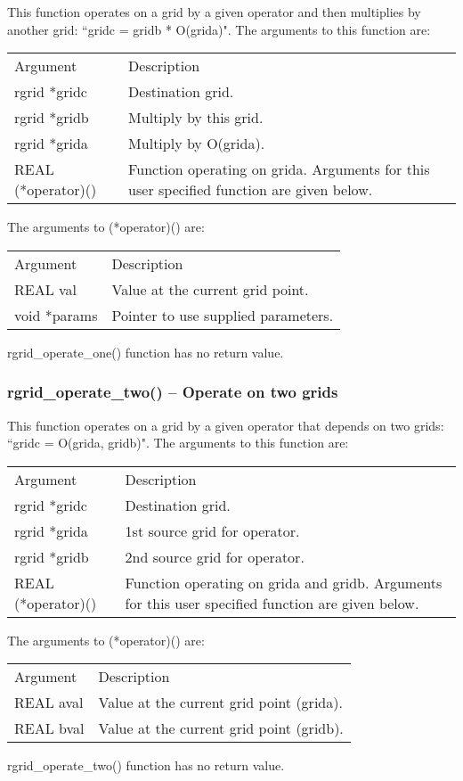\documentclass[12pt,letterpaper]{article}
\begin{document}
This function  operates on a grid by a given operator and then multiplies by another grid: ``gridc = gridb * O(grida)". The arguments to this function are:
\begin{longtable}{p{} p{}}
Argument & Description\\
\cline{1-2}
rgrid *gridc & Destination grid.\\
rgrid *gridb & Multiply by this grid.\\
rgrid *grida & Multiply by O(grida).\\
REAL (*operator)() & Function operating on grida. Arguments for this user specified function are given below.\\
\end{longtable}
The arguments to (*operator)() are:
\begin{longtable}{p{} p{}}
Argument & Description\\
\cline{1-2}
REAL val & Value at the current grid point.\\
void *params & Pointer to use supplied parameters.\\
\end{longtable}
\noindent
rgrid\_operate\_one() function has no return value.

\subsubsection{rgrid\_operate\_two() -- Operate on two grids}

This function  operates on a grid by a given operator that depends on two grids: ``gridc = O(grida, gridb)". The arguments to this function are:
\begin{longtable}{p{} p{}}
Argument & Description\\
\cline{1-2}
rgrid *gridc & Destination grid.\\
rgrid *grida & 1st source grid for operator.\\
rgrid *gridb & 2nd source grid for operator.\\
REAL (*operator)() & Function operating on grida and gridb. Arguments for this user specified function are given below.\\
\end{longtable}
The arguments to (*operator)() are:
\begin{longtable}{p{} p{}}
Argument & Description\\
\cline{1-2}
REAL aval & Value at the current grid point (grida).\\
REAL bval & Value at the current grid point (gridb).\\
\end{longtable}
\noindent
rgrid\_operate\_two() function has no return value.
\end{document}
